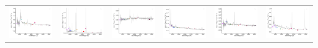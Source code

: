 \begin{center}
\begin{longtable}{l l l l l l }
    \includegraphics[width=0.3\linewidth, clip]{Figs/Figs-sdss/spec-9146-58042-0510-STRIPE82-0131-050516.pdf} & \includegraphics[width=0.3\linewidth, clip]{Figs/Figs-sdss/spec-9150-58043-0660-STRIPE82-0143-028004.pdf} & \includegraphics[width=0.3\linewidth, clip]{Figs/Figs-sdss/spec-9151-58067-0073-STRIPE82-0147-026690.pdf} & \includegraphics[width=0.3\linewidth, clip]{Figs/Figs-sdss/spec-9152-58041-0463-STRIPE82-0147-005730.pdf} & \includegraphics[width=0.3\linewidth, clip]{Figs/Figs-sdss/spec-9163-58043-0013-STRIPE82-0122-036068.pdf} & \includegraphics[width=0.3\linewidth, clip]{Figs/Figs-sdss/spec-9163-58043-0152-STRIPE82-0122-053411.pdf} \\

\end{longtable}
\end{center}
